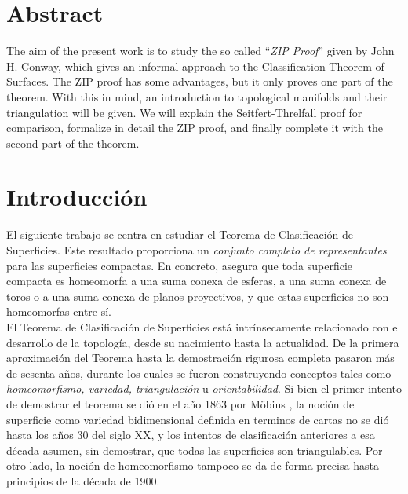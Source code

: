 \documentclass[10pt]{report}
\theoremstyle{definition}
\newcommand\blankpage{%
    \null
    \thispagestyle{empty}%
    \newpage}
\begin{document}
\section*{Abstract}
The aim of the present work is to study the so called ``\textit{ZIP Proof}'' given by John H. Conway, which gives an informal approach to the Classification Theorem of Surfaces. The ZIP proof has some advantages, but it only proves one part of the theorem. With this in mind, an introduction to topological manifolds and their triangulation will be given. We will explain the Seitfert-Threlfall proof for comparison, formalize in detail the ZIP proof, and finally complete it with the second part of the theorem.
\afterpage{\blankpage}

\clearpage

\section*{Introducción}
El siguiente trabajo se centra en estudiar el Teorema de Clasificación de Superficies. Este resultado proporciona un \textit{conjunto completo de representantes} para las superficies compactas. En concreto, asegura que toda superficie compacta es homeomorfa a una suma conexa de esferas, a una suma conexa de toros o a una suma conexa de planos proyectivos, y que estas superficies no son homeomorfas entre sí.\\

El Teorema de Clasificación de Superficies está intrínsecamente relacionado con el desarrollo de la topología, desde su nacimiento hasta la actualidad. De la primera aproximación del Teorema hasta la demostración rigurosa completa pasaron más de sesenta años, durante los cuales se fueron construyendo conceptos tales como \textit{homeomorfismo, variedad, triangulación} u \textit{orientabilidad}. Si bien el primer intento de demostrar el teorema se dió en el año 1863 por Möbius \cite{mobius}, la noción de superficie como variedad bidimensional definida en terminos de cartas no se dió hasta los años 30 del siglo XX, y los intentos de clasificación anteriores a esa década asumen, sin demostrar, que todas las superficies son triangulables. Por otro lado, la noción de homeomorfismo tampoco se da de forma precisa hasta principios de la década de 1900.\\
\end{document}
